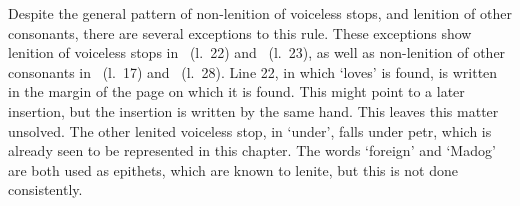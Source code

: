 Despite the general pattern of non-lenition of voiceless stops, and lenition of other consonants, there are several exceptions to this rule.
These exceptions show lenition of voiceless stops in ~(l.~22) and ~(l.~23), as well as non-lenition of other consonants in ~(l.~17) and ~(l.~28).
Line 22, in which  `loves' is found, is written in the margin of the page on which it is found.
This might point to a later insertion, but the insertion is written by the same hand.
This leaves this matter unsolved. The other lenited voiceless stop, in  `under', falls under \gls{petr}, which is already seen to be represented in this chapter.
The words  `foreign' and  `Madog' are both used as epithets, which are known to lenite, but this is not done consistently.

